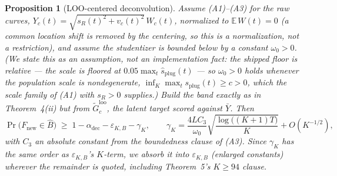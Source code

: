 \documentclass[12pt]{article}
\newtheorem{proposition}{Proposition}
\theoremstyle{definition}
\theoremstyle{remark}
\begin{document}
\begin{proposition}[LOO-centered deconvolution]\label{prop:loodec}
Assume (A1)--(A3) for the raw curves,
$Y_c(t)=\sqrt{s_R(t)^2+v_c(t)^2}\,W_c(t)$, normalized to
$\mathbb E\,W(t)=0$ (a common location shift is removed by the centering, so
this is a normalization, not a restriction), and assume the studentizer is
bounded below by a constant $\omega_0>0$. (We state this as an assumption,
not an implementation fact: the shipped floor is \emph{relative} --- the
scale is floored at $0.05\max_t\widehat s_{\text{plug}}(t)$ --- so
$\omega_0>0$ holds whenever the population scale is nondegenerate,
$\inf_K\max_t s_{\text{plug}}(t)\ge c>0$, which the scale family of (A1)
with $s_R>0$ supplies.) Build the band exactly as in Theorem~4(ii) but from
$\widetilde G^{\text{loo}}_c$, the latent target scored against $\bar Y$.
Then
\[
\Pr\big(F_{\text{new}}\in\widehat B\big)\;\ge\;
1-\alpha_{\text{dec}}-\varepsilon_{K,B}-\gamma_K,
\qquad
\gamma_K=\frac{4LC_3}{\omega_0}\sqrt{\frac{\log\big((K{+}1)T\big)}{K}}
+O(K^{-1/2}),
\]
with $C_3$ an absolute constant from the boundedness clause of (A3). Since
$\gamma_K$ has the same order as $\varepsilon_{K,B}$'s $K$-term, we absorb
it into $\varepsilon_{K,B}$ (enlarged constants) wherever the remainder is
quoted, including Theorem~5's $K\ge94$ clause.
\end{proposition}
\end{document}
